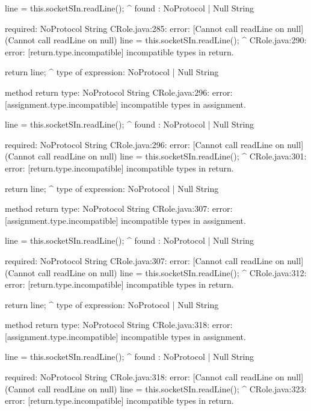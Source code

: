 \begin{code}
            line = this.socketSIn.readLine();
                                          ^
  found   : NoProtocol | Null String

  required: NoProtocol String
CRole.java:285: error: [Cannot call readLine on null] (Cannot call readLine on null)
            line = this.socketSIn.readLine();
                                          ^
CRole.java:290: error: [return.type.incompatible] incompatible types in return.

        return line;
               ^
  type of expression: NoProtocol | Null String

  method return type: NoProtocol String
CRole.java:296: error: [assignment.type.incompatible] incompatible types in assignment.

            line = this.socketSIn.readLine();
                                          ^
  found   : NoProtocol | Null String

  required: NoProtocol String
CRole.java:296: error: [Cannot call readLine on null] (Cannot call readLine on null)
            line = this.socketSIn.readLine();
                                          ^
CRole.java:301: error: [return.type.incompatible] incompatible types in return.

        return line;
               ^
  type of expression: NoProtocol | Null String

  method return type: NoProtocol String
CRole.java:307: error: [assignment.type.incompatible] incompatible types in assignment.

            line = this.socketSIn.readLine();
                                          ^
  found   : NoProtocol | Null String

  required: NoProtocol String
CRole.java:307: error: [Cannot call readLine on null] (Cannot call readLine on null)
            line = this.socketSIn.readLine();
                                          ^
CRole.java:312: error: [return.type.incompatible] incompatible types in return.

        return line;
               ^
  type of expression: NoProtocol | Null String

  method return type: NoProtocol String
CRole.java:318: error: [assignment.type.incompatible] incompatible types in assignment.

            line = this.socketSIn.readLine();
                                          ^
  found   : NoProtocol | Null String

  required: NoProtocol String
CRole.java:318: error: [Cannot call readLine on null] (Cannot call readLine on null)
            line = this.socketSIn.readLine();
                                          ^
CRole.java:323: error: [return.type.incompatible] incompatible types in return.


\end{code}

